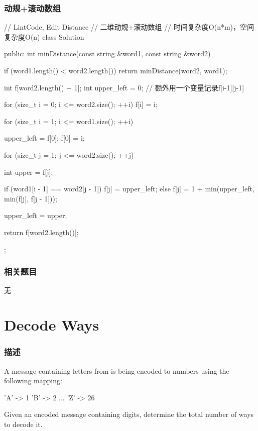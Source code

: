 \subsubsection{动规+滚动数组}
\begin{Code}
// LintCode, Edit Distance
// 二维动规+滚动数组
// 时间复杂度O(n*m)，空间复杂度O(n)
class Solution {
public:
    int minDistance(const string &word1, const string &word2) {
        if (word1.length() < word2.length())
            return minDistance(word2, word1);

        int f[word2.length() + 1];
        int upper_left = 0; // 额外用一个变量记录f[i-1][j-1]

        for (size_t i = 0; i <= word2.size(); ++i)
            f[i] = i;

        for (size_t i = 1; i <= word1.size(); ++i) {
            upper_left = f[0];
            f[0] = i;

            for (size_t j = 1; j <= word2.size(); ++j) {
                int upper = f[j];

                if (word1[i - 1] == word2[j - 1])
                    f[j] = upper_left;
                else
                    f[j] = 1 + min(upper_left, min(f[j], f[j - 1]));

                upper_left = upper;
            }
        }

        return f[word2.length()];
    }
};
\end{Code}


\subsubsection{相关题目}
\begindot
\item 无
\myenddot


\section{Decode Ways} %
\label{sec:decode-ways}


\subsubsection{描述}
A message containing letters from  is being encoded to numbers using the following mapping:
\begin{Code}
'A' -> 1
'B' -> 2
...
'Z' -> 26
\end{Code}

Given an encoded message containing digits, determine the total number of ways to decode it.

